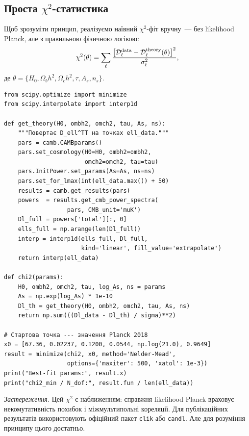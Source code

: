 \subsection{Проста $\chi^2$-статистика}

Щоб зрозуміти принцип, реалізуємо наївний $\chi^2$-фіт вручну~---
без likelihood Planck, але з правильною фізичною логікою:
\begin{equation}\label{eq:chi2}
  \chi^2(\theta) = \sum_\ell
    \frac{\bigl[\mathcal{D}_\ell^{\rm data}
               - \mathcal{D}_\ell^{\rm theory}(\theta)\bigr]^2}
         {\sigma_\ell^2},
\end{equation}
де $\theta = \{H_0, \Omega_b h^2, \Omega_c h^2, \tau, A_s, n_s\}$.

\begin{verbatim}
from scipy.optimize import minimize
from scipy.interpolate import interp1d

def get_theory(H0, ombh2, omch2, tau, As, ns):
    """Повертає D_ell^TT на точках ell_data."""
    pars = camb.CAMBparams()
    pars.set_cosmology(H0=H0, ombh2=ombh2,
                       omch2=omch2, tau=tau)
    pars.InitPower.set_params(As=As, ns=ns)
    pars.set_for_lmax(int(ell_data.max()) + 50)
    results = camb.get_results(pars)
    powers  = results.get_cmb_power_spectra(
                  pars, CMB_unit='muK')
    Dl_full = powers['total'][:, 0]
    ells_full = np.arange(len(Dl_full))
    interp = interp1d(ells_full, Dl_full,
                      kind='linear', fill_value='extrapolate')
    return interp(ell_data)

def chi2(params):
    H0, ombh2, omch2, tau, log_As, ns = params
    As = np.exp(log_As) * 1e-10
    Dl_th = get_theory(H0, ombh2, omch2, tau, As, ns)
    return np.sum(((Dl_data - Dl_th) / sigma)**2)

# Стартова точка --- значення Planck 2018
x0 = [67.36, 0.02237, 0.1200, 0.0544, np.log(21.0), 0.9649]
result = minimize(chi2, x0, method='Nelder-Mead',
                  options={'maxiter': 500, 'xatol': 1e-3})
print("Best-fit params:", result.x)
print("chi2_min / N_dof:", result.fun / len(ell_data))
\end{verbatim}

\noindent
\textit{Застереження.} Цей $\chi^2$ є наближенням: справжня
likelihood Planck враховує некомутативність похибок і
міжмультипольні кореляції. Для публікаційних результатів
використовують офіційний пакет \texttt{clik} або
\texttt{candl}. Але для розуміння принципу цього достатньо.


